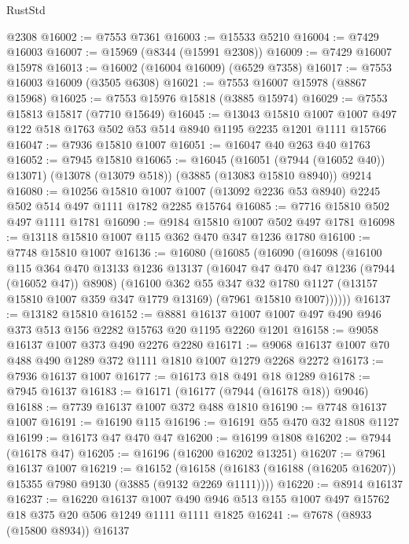 \begin{lexlean}{RustStd}
\begin{coremodule}
    @2308
@16002 := @7553 @7361
@16003 := @15533 @5210
@16004 := @7429 @16003
@16007 := @15969 (@8344 (@15991 @2308))
@16009 := @7429 @16007 @15978
@16013 := @16002 (@16004 @16009) (@6529 @7358)
@16017 := @7553 @16003 @16009 (@3505 @6308)
@16021 := @7553 @16007 @15978 (@8867 @15968)
@16025 := @7553 @15976 @15818 (@3885 @15974)
@16029 := @7553 @15813 @15817 (@7710 @15649)
@16045 := @13043
    @15810
    @1007
    @1007
    @497
    @122
    @518
    @1763
    @502
    @53
    @514
    @8940
    @1195
    @2235
    @1201
    @1111
    @15766
@16047 := @7936 @15810 @1007
@16051 := @16047 @40 @263 @40 @1763
@16052 := @7945 @15810
@16065 := @16045
    (@16051 (@7944 (@16052 @40)) @13071)
    (@13078 (@13079 @518))
    (@3885 (@13083 @15810 @8940))
    @9214
@16080 := @10256
    @15810
    @1007
    @1007
    (@13092 @2236 @53 @8940)
    @2245
    @502
    @514
    @497
    @1111
    @1782
    @2285
    @15764
@16085 := @7716 @15810 @502 @497 @1111 @1781
@16090 := @9184 @15810 @1007 @502 @497 @1781
@16098 := @13118 @15810 @1007 @115 @362 @470 @347 @1236 @1780
@16100 := @7748 @15810 @1007
@16136 := @16080
    (@16085
      (@16090
        (@16098
          (@16100
            @115
            @364
            @470
            @13133
            @1236
            @13137
            (@16047 @47 @470 @47 @1236 (@7944 (@16052 @47)) @8908)
            (@16100
              @362
              @55
              @347
              @32
              @1780
              @1127
              (@13157 @15810 @1007 @359 @347 @1779 @13169)
              (@7961 @15810 @1007))))))
@16137 := @13182 @15810
@16152 := @8881 @16137 @1007 @1007 @497 @490 @946 @373 @513 @156 @2282 @15763 @20 @1195 @2260 @1201
@16158 := @9058 @16137 @1007 @373 @490 @2276 @2280
@16171 := @9068 @16137 @1007 @70 @488 @490 @1289 @372 @1111 @1810 @1007 @1279 @2268 @2272
@16173 := @7936 @16137 @1007
@16177 := @16173 @18 @491 @18 @1289
@16178 := @7945 @16137
@16183 := @16171 (@16177 (@7944 (@16178 @18)) @9046)
@16188 := @7739 @16137 @1007 @372 @488 @1810
@16190 := @7748 @16137 @1007
@16191 := @16190 @115
@16196 := @16191 @55 @470 @32 @1808 @1127
@16199 := @16173 @47 @470 @47
@16200 := @16199 @1808
@16202 := @7944 (@16178 @47)
@16205 := @16196 (@16200 @16202 @13251)
@16207 := @7961 @16137 @1007
@16219 := @16152
    (@16158 (@16183 (@16188 (@16205 @16207)) @15355 @7980 @9130 (@3885 (@9132 @2269 @1111))))
@16220 := @8914 @16137
@16237 := @16220
    @16137
    @1007
    @490
    @946
    @513
    @155
    @1007
    @497
    @15762
    @18
    @375
    @20
    @506
    @1249
    @1111
    @1111
    @1825
@16241 := @7678 (@8933 (@15800 @8934)) @16137

\end{coremodule}
\end{lexlean}
